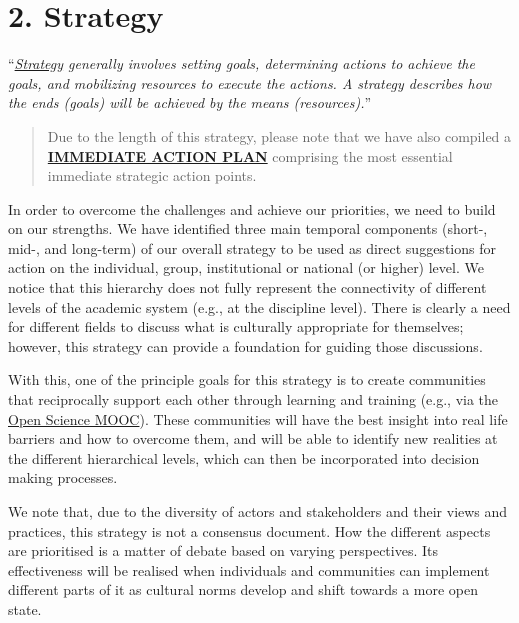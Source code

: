 \section{2. Strategy }\label{strategy}

``\emph{\href{https://en.wikipedia.org/wiki/Strategy}{Strategy}
generally involves setting goals, determining actions to achieve the
goals, and mobilizing resources to execute the actions. A strategy
describes how the ends (goals) will be achieved by the means
(resources).}''

\begin{quote}
Due to the length of this strategy, please note that we have also
compiled a
\href{https://github.com/Open-Scholarship-Strategy/site/blob/master/immediate-action-plan.pdf}{\textbf{IMMEDIATE
ACTION PLAN}} comprising the most essential immediate strategic action
points.
\end{quote}

In order to overcome the challenges and achieve our priorities, we need
to build on our strengths. We have identified three main temporal
components (short-, mid-, and long-term) of our overall strategy to be
used as direct suggestions for action on the individual, group,
institutional or national (or higher) level. We notice that this
hierarchy does not fully represent the connectivity of different levels
of the academic system (e.g., at the discipline level). There is clearly
a need for different fields to discuss what is culturally appropriate
for themselves; however, this strategy can provide a foundation for
guiding those discussions.

With this, one of the principle goals for this strategy is to create
communities that reciprocally support each other through learning and
training (e.g., via the \href{https://eliademy.com/opensciencemooc}{Open
Science MOOC}). These communities will have the best insight into real
life barriers and how to overcome them, and will be able to identify new
realities at the different hierarchical levels, which can then be
incorporated into decision making processes.

We note that, due to the diversity of actors and stakeholders and their
views and practices, this strategy is not a consensus document. How the
different aspects are prioritised is a matter of debate based on varying
perspectives. Its effectiveness will be realised when individuals and
communities can implement different parts of it as cultural norms
develop and shift towards a more open state.

